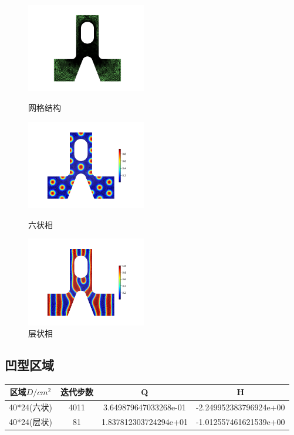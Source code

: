 \documentclass[12pt]{article}
\begin{document}
\begin{CJK}{UTF8}{gkai}
  \begin{figure}[H]
  	\setlength{\abovecaptionskip}{0.cm}
  	\setlength{\belowcaptionskip}{-0.cm}
  	\begin{minipage}[!htbp]{0.3\linewidth}
  		\includegraphics[width=5.2cm]{Figure_bc.png}
  		\caption*{网格结构}
  	\end{minipage}
  	\hspace{0.23in}
  	\begin{minipage}[!htbp]{0.3\linewidth}
  		\includegraphics[width=5.2cm]{scftfigurebuming.png}
  		\caption*{六状相}
  	\end{minipage}
  	\hspace{0.23in}
  	\begin{minipage}[!htbp]{0.3\linewidth}
  		\includegraphics[width=5.2cm]{scftfigure880.png}
  		\caption*{层状相}
  	\end{minipage}
  \end{figure}
    \subsection{凹型区域}   
    \begin{table}[H]
    		\centering
    	\begin{tabular}{cccc}
    		\toprule
    		区域$D/cm^2$ &	迭代步数 & Q &  H \\
    		\midrule
    		40*24(六状)&4011 &3.649879647033268e-01 & -2.249952383796924e+00\\
    		40*24(层状)&81& 1.837812303724294e+01 & -1.012557461621539e+00\\
    		\bottomrule
    	\end{tabular}
    \end{table}
    

\end{CJK}
\end{document}
